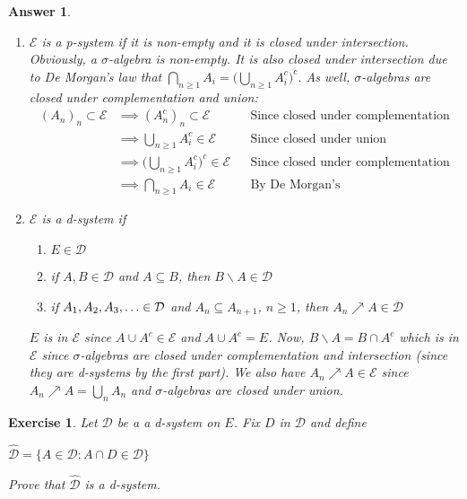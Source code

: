 \documentclass[12pt]{article}
\theoremstyle{colon}
\newtheorem{exercise}{Exercise}
\newtheorem*{answer}{Answer}
\begin{document}
\begin{answer}
  \leavevmode
  \begin{enumerate}[label=\roman*)]
    \item $\mathcal{E}$ is a p-system if it is non-empty and it is closed under intersection. Obviously, a $\sigma$-algebra is non-empty. It is also closed under intersection due to De Morgan's law that $\bigcap\limits_{n \geq 1} A_i = \Big( \bigcup\limits_{n \geq 1} A_i^c \Big)^c$. As well, $\sigma$-algebras are closed under complementation and union:
      \begin{align*}
          (A_n)_n \subset \mathcal{E} &\implies (A_n^c)_n \subset \mathcal{E} && \text{Since closed under complementation}\\
          &\implies \bigcup\limits_{n \geq 1} A_i^c \in \mathcal{E} && \text{Since closed under union} \\
          &\implies \Big( \bigcup\limits_{n \geq 1} A_i^c \Big)^c \in \mathcal{E} && \text{Since closed under complementation} \\
          &\implies \bigcap\limits_{n \geq 1} A_i \in \mathcal{E}  && \text{By De Morgan's}
      \end{align*}
    \item $\mathcal{E}$ is a d-system if
      \begin{enumerate}[label=\roman*)]
        \item $E \in \mathcal{D}$
        \item if $A, B \in \mathcal{D}$ and $A \subseteq B$, then $B \backslash A \in \mathcal{D}$
        \item if $A_1, A_2, A_3, \mathellipsis \in \mathcal{D}$ and $A_n \subseteq A_{n+1}$, $n \geq 1$, then $A_n \nearrow A \in \mathcal{D}$
      \end{enumerate}

      $E$ is in $\mathcal{E}$ since $A \cup A^c \in \mathcal{E}$ and $A \cup A^c = E$. Now, $B \backslash A = B \cap A^c$ which is in $\mathcal{E}$ since $\sigma$-algebras are closed under complementation and intersection (since they are d-systems by the first part). We also have $A_n \nearrow A \in \mathcal{E}$ since $A_n \nearrow A = \bigcup_n A_n$ and $\sigma$-algebras are closed under union.
  \end{enumerate}
\end{answer}

\clearpage

\begin{exercise}
  Let $\mathcal{D}$ be a a d-system on $E$. Fix $D$ in $\mathcal{D}$ and define
  \begin{center}
    $\widehat{\mathcal{D}} = \{A \in \mathcal{D}: A \cap D \in \mathcal{D}\}$
  \end{center}
  Prove that $\widehat{\mathcal{D}}$ is a d-system.
\end{exercise}
\end{document}
